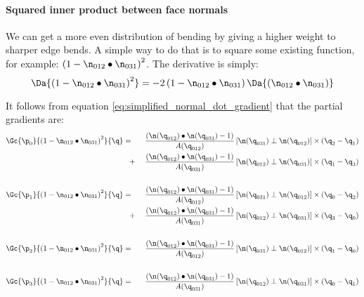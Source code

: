 
\paragraph{Squared inner product between face normals}
\label{sec:squared_normal_dot}

We can get a more even distribution of bending by giving
a higher weight to sharper edge bends.
A simple way to do that is to square some existing function,
for example: $\left(1 - \n_{012} \bullet \n_{031}\right)^2$.
The derivative is simply:
\begin{equation}
\Da{\left(1 - \n_{012} \bullet \n_{031}\right)^2}
= -2 \left( 1 - \n_{012} \bullet \n_{031} \right)
\Da{(\n_{012} \bullet \n_{031})} 
\end{equation}

It follows from equation \ref{eq:simplified_normal_dot_gradient}
that the partial gradients are:
\begin{eqnarray}
\label{eq:squared_normal_dot_gradient}
\Gc{\p_0}{\left(1 - \n_{012} \bullet \n_{031}\right)^2}{\q}
& = \;\;\; &
\frac{\left( \n(\q_{012}) \bullet \n(\q_{031}) - 1\right)
}
{A(\q_{012}) }
\left[ \n(\q_{031}) \perp \n(\q_{012}) \right]
\times (\q_2 - \q_1)
\\
& \;\;\; + &
\frac{\left( \n(\q_{012}) \bullet \n(\q_{031}) - 1\right)
}{A(\q_{031})}
\left[ \n(\q_{012}) \perp \n(\q_{031}) \right]
\times (\q_1 - \q_3)
\nonumber \\
& & \nonumber \\
\Gc{\p_1}{\left(1 - \n_{012} \bullet \n_{031}\right)^2}{\q}
& = \;\;\; &
\frac{\left( \n(\q_{012}) \bullet \n(\q_{031}) - 1\right)
}{A(\q_{012})}
\left[ \n(\q_{031}) \perp \n(\q_{012}) \right]
\times (\q_0 - \q_2)
\nonumber \\
& \;\;\; + &
\frac{\left( \n(\q_{012}) \bullet \n(\q_{031}) - 1\right)
}{A(\q_{031})}
\left[ \n(\q_{012}) \perp \n(\q_{031}) \right]
\times (\q_3 - \q_0)
\nonumber \\
& & \nonumber \\
\Gc{\p_2}{\left(1 - \n_{012} \bullet \n_{031}\right)^2}{\q}
& = \;\;\; &
\frac{\left( \n(\q_{012}) \bullet \n(\q_{031}) - 1\right)
}{A(\q_{012})}
\left[ \n(\q_{031}) \perp \n(\q_{012}) \right]
\times (\q_1 - \q_0)
\nonumber \\
& & \nonumber \\
\Gc{\p_3}{\left(1 - \n_{012} \bullet \n_{031}\right)^2}{\q}
& = \;\;\; &
\frac{\left( \n(\q_{012}) \bullet \n(\q_{031}) - 1\right)
}{A(\q_{031})}
\left[ \n(\q_{012}) \perp \n(\q_{031}) \right]
\times (\q_0 - \q_1)
\nonumber
\end{eqnarray}

